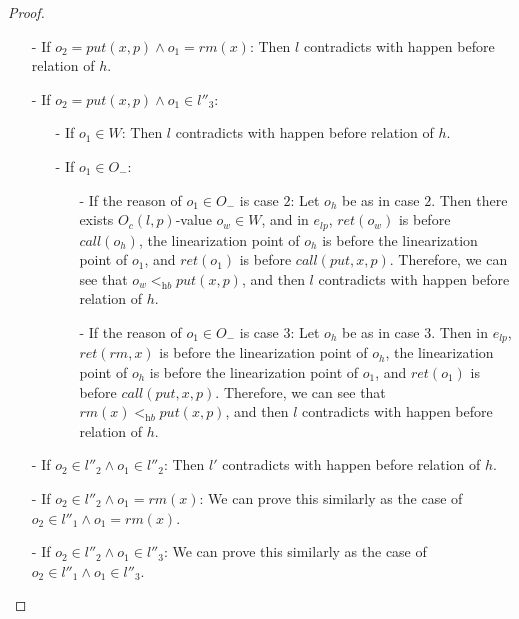 \begin {proof}
\begin{itemize}
\item[-] If $o_2 = \textit{put}(x,p) \wedge o_1 = \textit{rm}(x)$: Then $l$ contradicts with happen before relation of $h$.

\item[-] If $o_2 = \textit{put}(x,p) \wedge o_1 \in l''_3$:
    \begin{itemize}
    \setlength{\itemsep}{0.5pt}
    \item[-] If $o_1 \in W$: Then $l$ contradicts with happen before relation of $h$.

    \item[-] If $o_1 \in O_-$:
         \begin{itemize}
         \setlength{\itemsep}{0.5pt}
         \item[-] If the reason of $o_1 \in O_-$ is case $2$: Let $o_h$ be as in case $2$. Then there exists $O_c(l,p)$-value $o_w \in W$, and in $e_{\textit{lp}}$, $\textit{ret}(o_w)$ is before $\textit{call}(o_h)$, the linearization point of $o_h$ is before the linearization point of $o_1$, and $\textit{ret}(o_1)$ is before $\textit{call}(\textit{put},x,p)$. Therefore, we can see that $o_w <_{\textit{hb}} \textit{put}(x,p)$, and then $l$ contradicts with happen before relation of $h$.

         \item[-] If the reason of $o_1 \in O_-$ is case $3$: Let $o_h$ be as in case $3$. Then in $e_{\textit{lp}}$, $\textit{ret}(\textit{rm},x)$ is before the linearization point of $o_h$, the linearization point of $o_h$ is before the linearization point of $o_1$, and $\textit{ret}(o_1)$ is before $\textit{call}(\textit{put},x,p)$. Therefore, we can see that $\textit{rm}(x) <_{\textit{hb}} \textit{put}(x,p)$, and then $l$ contradicts with happen before relation of $h$.
         \end{itemize}
    \end{itemize}

\item[-] If $o_2 \in l''_2 \wedge o_1 \in l''_2$: Then $l'$ contradicts with happen before relation of $h$.

\item[-] If $o_2 \in l''_2 \wedge o_1 = \textit{rm}(x)$: We can prove this similarly as the case of $o_2 \in l''_1 \wedge o_1 = \textit{rm}(x)$.

\item[-] If $o_2 \in l''_2 \wedge o_1 \in l''_3$: We can prove this similarly as the case of $o_2 \in l''_1 \wedge o_1 \in l''_3$.


\end{itemize}
\end{proof}
